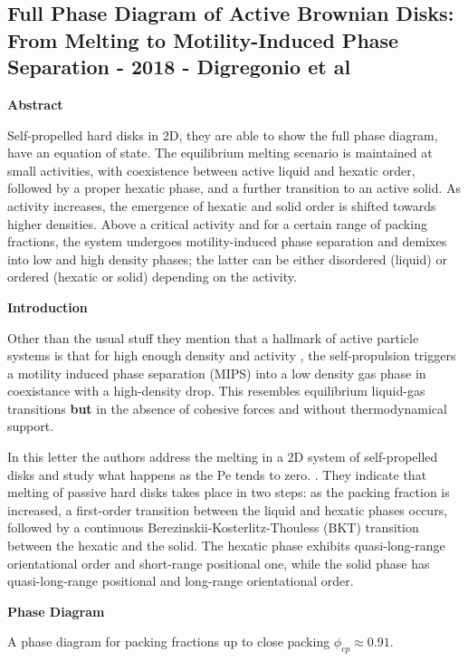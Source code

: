 \documentclass[a4paper]{article}
\begin{document}
\subsection{Full Phase Diagram of Active Brownian Disks: From Melting to Motility-Induced Phase Separation - 2018 - Digregonio et al}

\textbf{Abstract}

Self-propelled hard disks in 2D, they are able to show the full phase diagram, have an equation of state. The equilibrium melting scenario is maintained at small activities, with coexistence between active liquid and hexatic order, followed by a proper hexatic phase, and a further transition to an active solid. As activity increases, the emergence of hexatic and solid order is shifted towards higher densities. Above a critical activity and for a certain range of packing fractions, the system undergoes motility-induced phase separation and demixes into low and high density phases; the latter can be either disordered (liquid) or ordered (hexatic or solid) depending on the activity.

\textbf{Introduction}

Other than the usual stuff they mention that a hallmark of active particle systems is that for high enough density and activity , the self-propulsion triggers a motility induced phase separation (MIPS) into a low density gas phase in coexistance with a high-density drop. This resembles equilibrium liquid-gas transitions \textbf{but} in the absence of cohesive forces and without thermodynamical support.

In this letter the authors address the melting in a 2D system of self-propelled disks and study what happens as the Pe tends to zero. . They indicate that melting of passive hard disks takes place in two steps: as the packing fraction is increased, a first-order transition between the liquid and hexatic phases occurs, followed by a continuous Berezinskii-Kosterlitz-Thouless (BKT) transition between the hexatic and the solid. The hexatic phase exhibits quasi-long-range orientational order and short-range positional one, while the solid phase has quasi-long-range positional and long-range orientational order.

\textbf{Phase Diagram}

A phase diagram for packing fractions up to close packing $\phi_{cp}\approx 0.91$.
\end{document}
